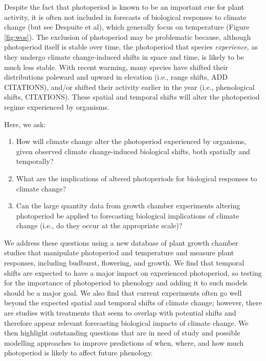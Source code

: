\documentclass{article}
\begin{document}
\par Despite the fact that photoperiod is known to be an important cue for plant activity, it is often not included in forecasts of biological responses to climate change (but see Despuite et al), which generally focus on temperature (Figure \ref{fig:wos}). The exclusion of photoperiod may be problematic because, although photoperiod itself is stable over time, the photoperiod that species \emph{experience}, as they undergo climate change-induced shifts in space and time, is likely to be much less stable. With recent warming, many species have shifted their distributions poleward and upward in elevation (i.e., range shifts, ADD CITATIONS), and/or shifted their activity earlier in the year (i.e., phenological shifts, CITATIONS). These spatial and temporal shifts will alter the photoperiod regime experienced by organisms. 
\par Here, we ask: 
\begin{enumerate}
\item How will climate change alter the photoperiod experienced by organisms, given observed climate change-induced biological shifts, both spatially and temporally?
\item What are the implications of altered photoperiods for biological responses to climate change?
\item Can the large quantity data from growth chamber experiments altering photoperiod be applied to forecasting biological implications of climate change (i.e., do they occur at the appropriate scale)?

\end{enumerate}
\par We address these questions using a new database of plant growth chamber studies that manipulate photoperiod and temperature and measure plant responses, including budburst, flowering, and growth. We find that %
temporal shifts are expected to have a major impact on experienced photoperiod, so testing for the importance of photoperiod to phenology and adding it to such models should be a major goal. We also find that current experiments often go well beyond the expected spatial and temporal shifts of climate change; however, there are studies with treatments that seem to overlap with potential shifts and therefore appear relevant forecasting biological impacts of climate change. We then highlight outstanding questions that are in need of study and possible modelling approaches to improve predictions of when, where, and how much photoperiod is likely to affect future phenology.
\end{document}
